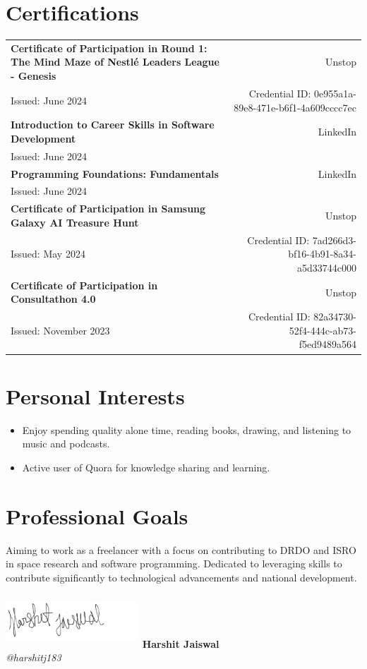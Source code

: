\documentclass[a4paper,10pt]{article}
\begin{document}
\section*{Certifications}
\begin{tabularx}{\textwidth}{Xr}
    \textbf{Certificate of Participation in Round 1: The Mind Maze of Nestlé Leaders League - Genesis} & Unstop \\
    Issued: June 2024 & Credential ID: 0e955a1a-89e8-471e-b6f1-4a609cccc7ec \\
    \textbf{Introduction to Career Skills in Software Development} & LinkedIn \\
    Issued: June 2024 & \\
    \textbf{Programming Foundations: Fundamentals} & LinkedIn \\
    Issued: June 2024 & \\
    \textbf{Certificate of Participation in Samsung Galaxy AI Treasure Hunt} & Unstop \\
    Issued: May 2024 & Credential ID: 7ad266d3-bf16-4b91-8a34-a5d33744c000 \\
    \textbf{Certificate of Participation in Consultathon 4.0} & Unstop \\
    Issued: November 2023 & Credential ID: 82a34730-52f4-444c-ab73-f5ed9489a564 \\
\end{tabularx}

\section*{Personal Interests}
\begin{itemize}[label=--]
    \item Enjoy spending quality alone time, reading books, drawing, and listening to music and podcasts.
    \item Active user of Quora for knowledge sharing and learning.
\end{itemize}

\section*{Professional Goals}
Aiming to work as a freelancer with a focus on contributing to DRDO and ISRO in space research and software programming. Dedicated to leveraging skills to contribute significantly to technological advancements and national development.

\begin{center}
    \includegraphics[width=5cm, height=2cm, keepaspectratio]{signature.jpg}
    \vspace{0.5cm}
    \textbf{Harshit Jaiswal} \\
    \textit{@harshitj183}
\end{center}
\end{document}
